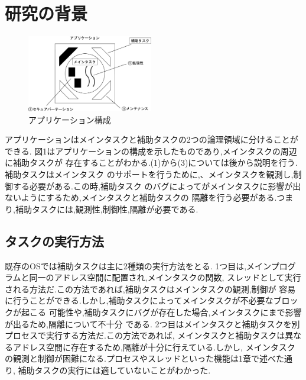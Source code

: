 \documentclass[submit,techreq,noauthor]{eco}	%
\begin{document}
\section{研究の背景}

\begin{figure}[H]
  \centering
  \includegraphics[width=5.5cm]{fig/pic1.eps}
  \caption{アプリケーション構成}
\end{figure}

アプリケーションはメインタスクと補助タスクの2つの論理領域に分けることができる.
図1はアプリケーションの構成を示したものであり,メインタスクの周辺に補助タスクが
存在することがわかる.(1)から(3)については後から説明を行う.補助タスクはメインタスク
のサポートを行うために,、メインタスクを観測し,制御する必要がある.この時,補助タスク
のバグによってがメインタスクに影響が出ないようにするため,メインタスクと補助タスクの
隔離を行う必要がある.つまり,補助タスクには,観測性,制御性,隔離が必要である.

\subsection{タスクの実行方法}
\indent 既存のOSでは補助タスクは主に2種類の実行方法をとる.
1つ目は,メインプログラムと同一のアドレス空間に配置され,メインタスクの関数,
スレッドとして実行される方法だ.この方法であれば,補助タスクはメインタスクの観測,制御が
容易に行うことができる.しかし,補助タスクによってメインタスクが不必要なブロックが起こる
可能性や,補助タスクにバグが存在した場合,メインタスクにまで影響が出るため,隔離について不十分
である.
2つ目はメインタスクと補助タスクを別プロセスで実行する方法だ.この方法であれば,
メインタスクと補助タスクは異なるアドレス空間に存在するため,隔離が十分に行えている.しかし,
メインタスクの観測と制御が困難になる.プロセスやスレッドといった機能は1章で述べた通り,
補助タスクの実行には適していないことがわかった.
\end{document}
